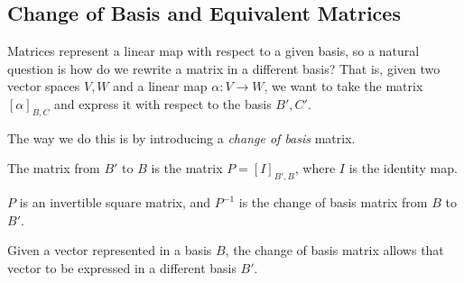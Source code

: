 \documentclass[a4paper]{scrartcl}
\begin{document}
    


\subsection{Change of Basis and Equivalent Matrices}

Matrices represent a linear map with respect to a given basis, so a natural question is how do we rewrite a matrix in a different basis? That is, 
given two vector spaces $V, W$ and a linear map $\alpha: V \rightarrow W$, we want to take the matrix $[\alpha]_{B, C}$ and express it with respect to the basis $B', C'$. 

The way we do this is by introducing a \emph{change of basis} matrix.

\begin{definition}    
    The  matrix from $B'$ to $B$ is the matrix
    $P = [I]_{B', B}$, where $I$ is the identity map.
\end{definition}
\begin{remark}
    $P$ is an invertible square matrix, and $P^{-1}$ is the change of basis matrix from $B$ to $B'$. 
\end{remark}

Given a vector represented in a basis $B$, the change of basis matrix allows that vector to be expressed in a different basis $B'$.
\end{document}
